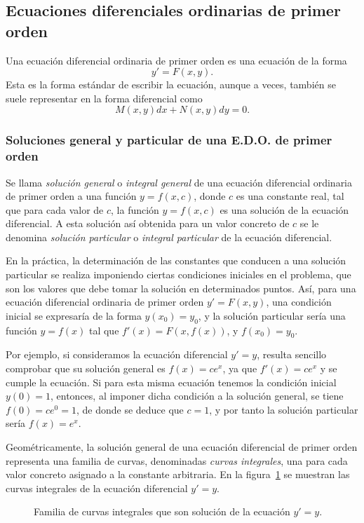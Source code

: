 \subsection{Ecuaciones diferenciales ordinarias de primer orden}
Una ecuación diferencial ordinaria de primer orden es una ecuación de la forma
\[
y'=F(x,y).
\]
Esta es la forma estándar de escribir la ecuación, aunque a veces, también se suele representar en la forma diferencial como
\[
M(x,y)dx+N(x,y)dy=0.
\]

\subsubsection*{Soluciones general y particular de una E.D.O. de primer orden}

Se llama \emph{solución general} o \emph{integral general} de una ecuación
diferencial ordinaria de primer orden a una función $y=f(x,c)$, donde
$c$ es una constante real, tal que para cada valor de $c$, la función
$y=f(x,c)$ es una solución de la ecuación diferencial. A esta solución
así obtenida para un valor concreto de $c$ se le denomina \emph{solución
particular} o \emph{integral particular} de la ecuación diferencial.

En la práctica, la determinación de las constantes que conducen a
una solución particular se realiza imponiendo ciertas condiciones
iniciales en el problema, que son los valores que debe tomar la
solución en determinados puntos. Así, para una ecuación diferencial
ordinaria de primer orden $y'=F(x,y)$, una condición inicial se
expresaría de la forma $y(x_{0})=y_{0}$, y la solución particular
sería una función $y=f(x)$ tal que $f'(x)=F(x,f(x))$, y
$f(x_0)=y_0$.

Por ejemplo, si consideramos la ecuación diferencial $y'=y$, resulta sencillo
comprobar que su solución general es $f(x)=ce^x$, ya que $f'(x)=ce^x$ y se cumple
la ecuación. Si para esta misma ecuación tenemos la condición inicial $y(0)=1$,
entonces, al imponer dicha condición a la solución general, se tiene $f(0)=ce^0=1$,
de donde se deduce que $c=1$, y por tanto la solución particular sería $f(x)=e^x$.

Geométricamente, la solución general de una ecuación diferencial de primer orden representa
una familia de curvas, denominadas \emph{curvas integrales}, una para cada valor concreto
asignado a la constante arbitraria. En la figura~\ref{g:curvas integrales} se muestran las
curvas integrales de la ecuación diferencial $y'=y$.

\begin{figure}[h!]
\begin{center}
\scalebox{1}{}
\caption{Familia de curvas integrales que son solución de la ecuación $y'=y$.}
\label{g:curvas integrales}
\end{center}
\end{figure}


